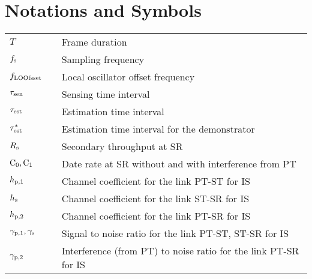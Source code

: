 
\chapter{Notations and Symbols}
\renewcommand{\arraystretch}{1.4}
\begin{longtable}{p{}p{}p{}}

       $T$                     & &             Frame duration \\
       $f_{\text{s}}$                 & &             Sampling frequency \\
       $f_{\text{LOOfsset}}$                  & & 	       Local oscillator offset frequency \\
       $\tau_{\text{sen}}$                 & &             Sensing time interval \\
       $\tau_{\text{est}}$                 & &             Estimation time interval \\      
       ${\tau}^*_{\text{est}}$               & &             Estimation time interval for the demonstrator \\      
       $R_{\text{s}}$                   & &          Secondary throughput at SR \\
       $\text{C}_{\text{0}},\text{C}_{\text{1}}$               & &          Date rate at SR without and with interference from PT  \\
      
       $h_{\text{p,1}}$                  & &             Channel coefficient for the link PT-ST for IS \\
       $h_{\text{s}}$                   & &             Channel coefficient for the link ST-SR for IS \\
       $h_{\text{p,2}}$                  & &             Channel coefficient for the link PT-SR for IS \\
       ${\gamma}_{\text{p,1}}, {\gamma}_{\text{s}}$      & &             Signal to noise ratio for the link PT-ST, ST-SR for IS \\
       ${\gamma}_{\text{p,2}}$                & &             Interference (from PT) to noise ratio for the link PT-SR for IS \\


\end{longtable}
